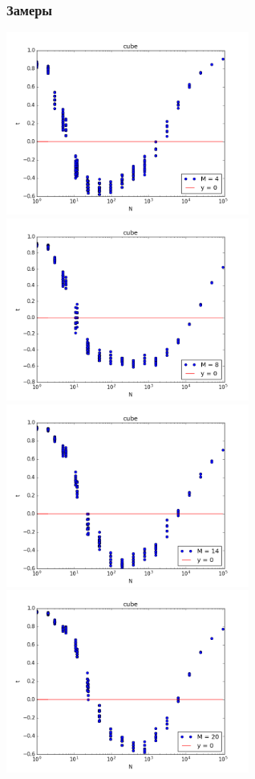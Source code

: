 \subsubsection{Замеры}
\begin{center}
\includegraphics[width = 8cm]{pic/cube_m=4}
\includegraphics[width = 8cm]{pic/cube_m=8}
\includegraphics[width = 8cm]{pic/cube_m=14}
\includegraphics[width = 8cm]{pic/cube_m=20}
\end{center}

